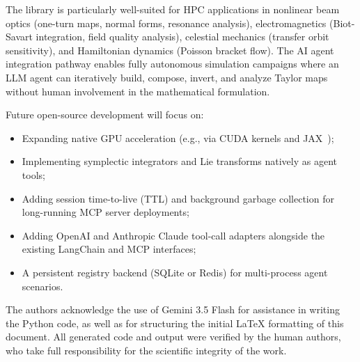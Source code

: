 \documentclass[aps,prb,reprint,superscriptaddress,nofootinbib]{revtex4-2}
\begin{document}
The library is particularly well-suited for HPC applications in nonlinear beam optics (one-turn maps, normal forms, resonance analysis), electromagnetics (Biot-Savart integration, field quality analysis), celestial mechanics (transfer orbit sensitivity), and Hamiltonian dynamics (Poisson bracket flow). The AI agent integration pathway enables fully autonomous simulation campaigns where an LLM agent can iteratively build, compose, invert, and analyze Taylor maps without human involvement in the mathematical formulation.

Future open-source development will focus on:
\begin{itemize}
    \item Expanding native GPU acceleration (e.g., via CUDA kernels and JAX~\cite{bradbury2018jax});
    \item Implementing symplectic integrators and Lie transforms natively as agent tools;
    \item Adding session time-to-live (TTL) and background garbage collection for long-running MCP server deployments;
    \item Adding OpenAI and Anthropic Claude tool-call adapters alongside the existing LangChain and MCP interfaces;
    \item A persistent registry backend (SQLite or Redis) for multi-process agent scenarios.
\end{itemize}
\begin{acknowledgments}
The authors acknowledge the use of Gemini 3.5 Flash for assistance in writing the Python code, as well as for structuring the initial LaTeX formatting of this document. All generated code and output were verified by the human authors, who take full responsibility for the scientific integrity of the work.
\end{acknowledgments}
\end{document}
